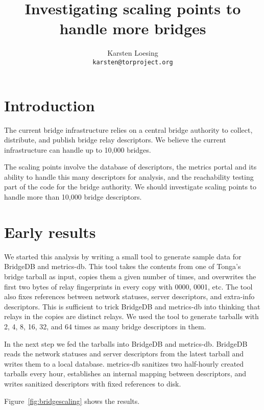 \documentclass{article}
\begin{document}
\title{Investigating scaling points to handle more bridges}
\author{Karsten Loesing\\{\tt karsten@torproject.org}}

\maketitle

\section{Introduction}

The current bridge infrastructure relies on a central bridge authority to
collect, distribute, and publish bridge relay descriptors.
We believe the current infrastructure can handle up to 10,000 bridges.

The scaling points involve the database of descriptors, the metrics portal
and its ability to handle this many descriptors for analysis, and the
reachability testing part of the code for the bridge authority.
We should investigate scaling points to handle more than 10,000 bridge
descriptors.

\section{Early results}

We started this analysis by writing a small tool to generate sample data
for BridgeDB and metrics-db.
This tool takes the contents from one of Tonga's bridge tarball as input,
copies them a given number of times, and overwrites the first two bytes of
relay fingerprints in every copy with 0000, 0001, etc.
The tool also fixes references between network statuses, server
descriptors, and extra-info descriptors.
This is sufficient to trick BridgeDB and metrics-db into thinking that
relays in the copies are distinct relays.
We used the tool to generate tarballs with 2, 4, 8, 16, 32, and 64 times
as many bridge descriptors in them.

In the next step we fed the tarballs into BridgeDB and metrics-db.
BridgeDB reads the network statuses and server descriptors from the latest
tarball and writes them to a local database.
metrics-db sanitizes two half-hourly created tarballs every hour,
establishes an internal mapping between descriptors, and writes sanitized
descriptors with fixed references to disk.

Figure~\ref{fig:bridgescaling} shows the results.
\end{document}
